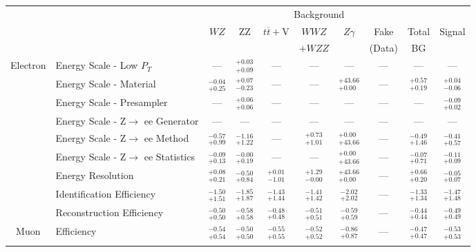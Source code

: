 
\renewcommand{\tabcolsep}{1pt}
\small\begin{tabular}{|cl||cccccc|c||c|}
\hline
 & & \multicolumn{7}{c||}{Background} & \\ 
 & & $WZ$ & ZZ & $t\overline{t}+$V & $WWZ$ & $Z\gamma$ & Fake & Total & Signal\\ 
 & & &  &  & $+WZZ$ &  & (Data) & BG & \\ 
\hline\hline
\multirow{9}{*}{Electron}
&Energy Scale - Low $P_{T}$ & --- &  $^{+0.03}_{+0.09}$  & --- & --- & --- & --- & --- & ---\\ 
\cline{2-10}
&Energy Scale - Material &  $^{-0.04}_{+0.25}$  &  $^{+0.07}_{-0.23}$  & --- & --- &  $^{+43.66}_{+0.00}$  & --- &  $^{+0.57}_{+0.19}$  &  $^{+0.04}_{-0.06}$ \\ 
\cline{2-10}
&Energy Scale - Presampler & --- &  $^{+0.06}_{+0.06}$  & --- & --- & --- & --- & --- &  $^{-0.09}_{+0.02}$ \\ 
\cline{2-10}
&Energy Scale - Z$\rightarrow$ ee Generator & --- & --- & --- & --- & --- & --- & --- & ---\\ 
\cline{2-10}
&Energy Scale - Z$\rightarrow$ ee Method &  $^{-0.57}_{+0.99}$  &  $^{-1.16}_{+1.22}$  & --- &  $^{+0.73}_{+1.01}$  &  $^{+0.00}_{+43.66}$  & --- &  $^{-0.49}_{+1.46}$  &  $^{-0.41}_{+0.57}$ \\ 
\cline{2-10}
&Energy Scale - Z$\rightarrow$ ee Statistics &  $^{-0.09}_{+0.13}$  &  $^{-0.00}_{+0.19}$  & --- & --- &  $^{+0.00}_{+43.66}$  & --- &  $^{-0.07}_{+0.71}$  &  $^{-0.11}_{+0.09}$ \\ 
\cline{2-10}
&Energy Resolution &  $^{+0.08}_{+0.21}$  &  $^{-0.50}_{+0.84}$  &  $^{+0.01}_{-1.01}$  &  $^{+1.29}_{-0.00}$  &  $^{+43.66}_{+0.00}$  & --- &  $^{+0.66}_{+0.20}$  &  $^{-0.05}_{+0.07}$ \\ 
\cline{2-10}
&Identification Efficiency &  $^{-1.50}_{+1.51}$  &  $^{-1.85}_{+1.87}$  &  $^{-1.43}_{+1.44}$  &  $^{-1.41}_{+1.42}$  &  $^{-2.02}_{+2.02}$  & --- &  $^{-1.33}_{+1.34}$  &  $^{-1.47}_{+1.48}$ \\ 
\cline{2-10}
&Reconstruction Efficiency &  $^{-0.50}_{+0.50}$  &  $^{-0.58}_{+0.58}$  &  $^{-0.48}_{+0.48}$  &  $^{-0.51}_{+0.51}$  &  $^{-0.59}_{+0.59}$  & --- &  $^{-0.44}_{+0.44}$  &  $^{-0.49}_{+0.49}$ \\ 
\hline
\multirow{4}{*}{Muon}
&Efficiency &  $^{-0.54}_{+0.54}$  &  $^{-0.50}_{+0.50}$  &  $^{-0.55}_{+0.55}$  &  $^{-0.52}_{+0.52}$  &  $^{-0.86}_{+0.87}$  & --- &  $^{-0.47}_{+0.47}$  &  $^{-0.53}_{+0.53}$ \\ 
\cline{2-10}

\end{tabular}

